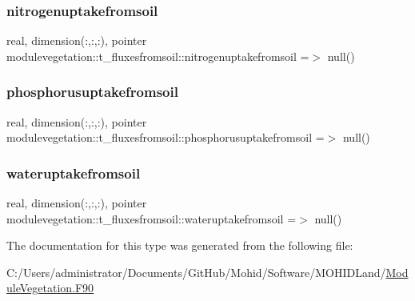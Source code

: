 \subsubsection{\texorpdfstring{nitrogenuptakefromsoil}{nitrogenuptakefromsoil}}
{\footnotesize\ttfamily real, dimension(\+:,\+:,\+:), pointer modulevegetation\+::t\+\_\+fluxesfromsoil\+::nitrogenuptakefromsoil =$>$ null()\hspace{0.3cm}{\ttfamily [private]}}

\mbox{\label{structmodulevegetation_1_1t__fluxesfromsoil_a49b395bebfb73adf315c1d160be0ac0e}} 
\subsubsection{\texorpdfstring{phosphorusuptakefromsoil}{phosphorusuptakefromsoil}}
{\footnotesize\ttfamily real, dimension(\+:,\+:,\+:), pointer modulevegetation\+::t\+\_\+fluxesfromsoil\+::phosphorusuptakefromsoil =$>$ null()\hspace{0.3cm}{\ttfamily [private]}}

\mbox{\label{structmodulevegetation_1_1t__fluxesfromsoil_a7c36e9cb31d8bf7ef7be9c4106e4e4ce}} 
\subsubsection{\texorpdfstring{wateruptakefromsoil}{wateruptakefromsoil}}
{\footnotesize\ttfamily real, dimension(\+:,\+:,\+:), pointer modulevegetation\+::t\+\_\+fluxesfromsoil\+::wateruptakefromsoil =$>$ null()\hspace{0.3cm}{\ttfamily [private]}}



The documentation for this type was generated from the following file\+:\begin{DoxyCompactItemize}
\item 
C\+:/\+Users/administrator/\+Documents/\+Git\+Hub/\+Mohid/\+Software/\+M\+O\+H\+I\+D\+Land/\mbox{\hyperlink{_module_vegetation_8_f90}{Module\+Vegetation.\+F90}}\end{DoxyCompactItemize}
